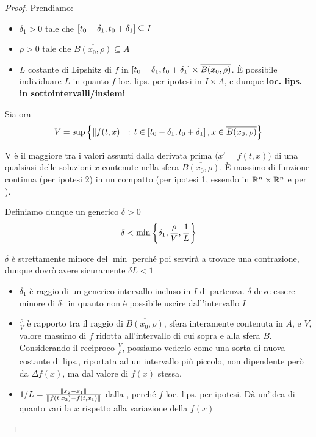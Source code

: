 \begin{theorem}
\begin{proof}
		Prendiamo:
		\begin{itemize}
			\item $\delta_1>0$ tale che $\left[t_0-\delta_1,t_0+\delta_1\right]\subseteq I$
			\item $\rho>0$ tale che $\overline{B(x_0,\rho)}\subseteq A$
			\item $L$ costante di Lipshitz di $f$ in $\left[t_0-\delta_1,t_0+\delta_1\right]\times\overline{B(x_0,\rho)}$. È possibile individuare $L$ in quanto $f$ loc. lips. per ipotesi in $I\times A$, e dunque \textbf{loc. lips. in sottointervalli/insiemi}
		\end{itemize}
		Sia ora
		\[V = \sup\left\{\left\|f(t,x)\right\|\,:\,t\in\left[t_0-\delta_1,t_0+\delta_1\right],x\in\overline{B(x_0,\rho)}\right\}\]
		\begin{note}
			V è il maggiore tra i valori assunti dalla derivata prima $\bigl(x'=f(t,x)\bigr)$ di una qualsiasi delle soluzioni $x$ contenute nella sfera $\overline{B(x_0,\rho)}$. È massimo di funzione continua (per ipotesi 2) in un compatto (per ipotesi 1, essendo in $\mathbb{R}^n\times\mathbb{R}^n$ e per ).
		\end{note}
		Definiamo dunque un generico $\delta>0$
		\begin{equation}
			\label{eq:cau_delta}
			\delta<\min\left\{\delta_1,\frac{\rho}{V},\frac{1}{L}\right\}
		\end{equation}
		\begin{note}
			$\delta$ è strettamente minore del $\min$ perché poi servirà a trovare una contrazione, dunque dovrò avere sicuramente $\delta L < 1$
		\end{note}
		\begin{itemize}
			\item $\delta_1$ è raggio di un generico intervallo incluso in $I$ di partenza. $\delta$ deve essere minore di $\delta_1$ in quanto non è possibile uscire dall'intervallo $I$
			\item $\frac{\rho}{V}$ è rapporto tra il raggio di $\overline{B(x_0,\rho)}$, sfera interamente contenuta in $A$, e $V$, valore massimo di $f$ ridotta all'intervallo di cui sopra e alla sfera $\overline{B}$.\\
			Considerando il reciproco $\frac{V}{\rho}$, possiamo vederlo come una sorta di nuova costante di lips., riportata ad un intervallo più piccolo, non dipendente però da $\Delta f(x)$, ma dal valore di $f(x)$ stessa.
			\item $1/L = \frac{\left\|x_2-x_1\right\|}{\left\|f(t,x_2)-f(t,x_1)\right\|}$ dalla , perché $f$ loc. lips. per ipotesi. Dà un'idea di quanto vari la $x$ rispetto alla variazione della $f(x)$

\end{itemize}
\end{proof}
\end{theorem}
